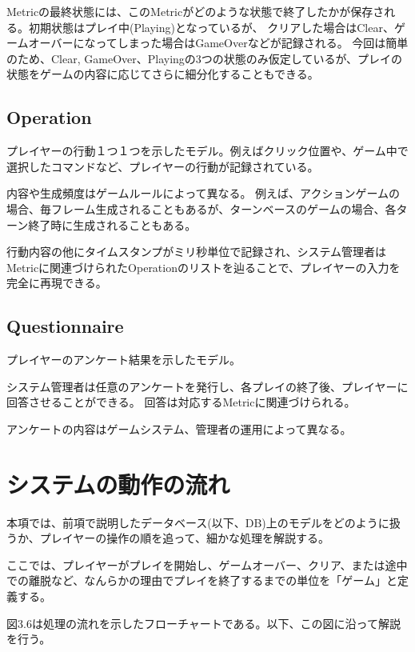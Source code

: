 Metricの最終状態には、このMetricがどのような状態で終了したかが保存される。初期状態はプレイ中(Playing)となっているが、
クリアした場合はClear、ゲームオーバーになってしまった場合はGameOverなどが記録される。
今回は簡単のため、Clear, GameOver、Playingの3つの状態のみ仮定しているが、プレイの状態をゲームの内容に応じてさらに細分化することもできる。

\subsection{Operation}
プレイヤーの行動１つ１つを示したモデル。例えばクリック位置や、ゲーム中で選択したコマンドなど、プレイヤーの行動が記録されている。

内容や生成頻度はゲームルールによって異なる。
例えば、アクションゲームの場合、毎フレーム生成されることもあるが、ターンベースのゲームの場合、各ターン終了時に生成されることもある。

行動内容の他にタイムスタンプがミリ秒単位で記録され、システム管理者はMetricに関連づけられたOperationのリストを辿ることで、プレイヤーの入力を完全に再現できる。

\subsection{Questionnaire}
プレイヤーのアンケート結果を示したモデル。

システム管理者は任意のアンケートを発行し、各プレイの終了後、プレイヤーに回答させることができる。
回答は対応するMetricに関連づけられる。

アンケートの内容はゲームシステム、管理者の運用によって異なる。

\section{システムの動作の流れ}
本項では、前項で説明したデータベース(以下、DB)上のモデルをどのように扱うか、プレイヤーの操作の順を追って、細かな処理を解説する。

ここでは、プレイヤーがプレイを開始し、ゲームオーバー、クリア、または途中での離脱など、なんらかの理由でプレイを終了するまでの単位を「ゲーム」と定義する。

図3.6は処理の流れを示したフローチャートである。以下、この図に沿って解説を行う。


